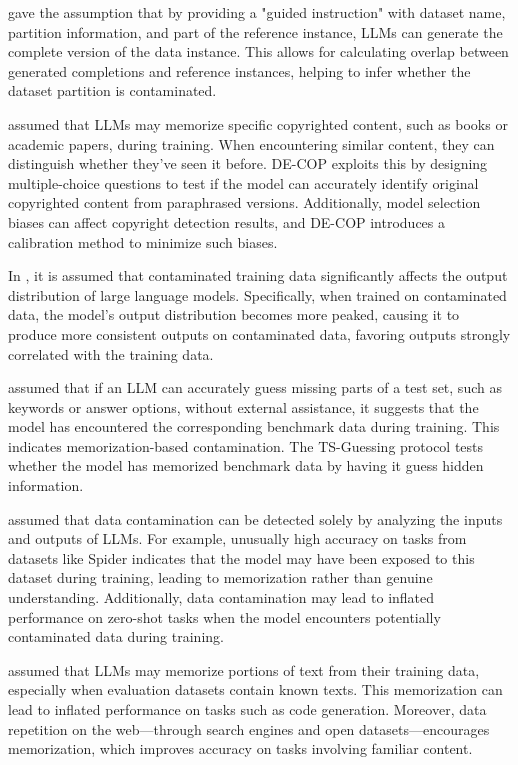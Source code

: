 \citet {golchin2023time} gave the assumption that by providing a "guided instruction" with dataset name, partition information, and part of the reference instance, LLMs can generate the complete version of the data instance. This allows for calculating overlap between generated completions and reference instances, helping to infer whether the dataset partition is contaminated. 

\citet{duarte2024decopdetectingcopyrightedcontent} assumed that LLMs may memorize specific copyrighted content, such as books or academic papers, during training. When encountering similar content, they can distinguish whether they've seen it before. DE-COP exploits this by designing multiple-choice questions to test if the model can accurately identify original copyrighted content from paraphrased versions. Additionally, model selection biases can affect copyright detection results, and DE-COP introduces a calibration method to minimize such biases.

In \cite{dong-etal-2024-generalization}, it is assumed that contaminated training data significantly affects the output distribution of large language models. Specifically, when trained on contaminated data, the model's output distribution becomes more peaked, causing it to produce more consistent outputs on contaminated data, favoring outputs strongly correlated with the training data.

\citet{deng2023investigating} assumed that if an LLM can accurately guess missing parts of a test set, such as keywords or answer options, without external assistance, it suggests that the model has encountered the corresponding benchmark data during training. This indicates memorization-based contamination. The TS-Guessing protocol tests whether the model has memorized benchmark data by having it guess hidden information.

\citet{ranaldi-etal-2024-investigating} assumed that data contamination can be detected solely by analyzing the inputs and outputs of LLMs. For example, unusually high accuracy on tasks from datasets like Spider indicates that the model may have been exposed to this dataset during training, leading to memorization rather than genuine understanding. Additionally, data contamination may lead to inflated performance on zero-shot tasks when the model encounters potentially contaminated data during training.

\citet{chang-etal-2023-speak} assumed that LLMs may memorize portions of text from their training data, especially when evaluation datasets contain known texts. This memorization can lead to inflated performance on tasks such as code generation. Moreover, data repetition on the web—through search engines and open datasets—encourages memorization, which improves accuracy on tasks involving familiar content.

